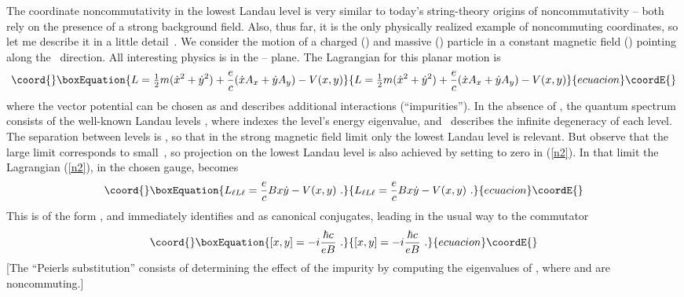 \documentclass[a4paper,12pt,twoside]{article}
\providecommand{\fract}[2]{{\textstyle\frac{#1}{#2}}}
\providecommand{\vA}{\vec A}
\providecommand{\ket}[1]{\bigl| #1 \bigr\rangle}
\providecommand{\numeq}[2]{\begin{equation}\coord{}\boxEquation{
#2
\label{#1}
}{
#2
}{ecuacion}\coordE{}\end{equation}}
\providecommand{\refeq}[1]{(\ref{#1})}
\let\vec\boldsymbol
\begin{document}
The coordinate noncommutativity in the lowest Landau level is very similar to today's
string-theory origins of noncommutativity -- both rely on the presence of a strong
background field. Also, thus far, it is the only physically realized example of noncommuting
coordinates, so let me describe it in a little detail~\cite{r2}.
We consider the motion of a charged (\coordHE{}) and massive (\coordHE{}) particle in a constant magnetic
field (\coordHE{}) pointing along the \coordHE{}~direction.  All interesting physics is in the \coordHE{}--\coordHE{} plane. The
Lagrangian for this planar motion is
\numeq{n2}{
L = \fract12 m(\dot x^2 +\dot y^2) + \frac ec (\dot x A_x + \dot y A_y) - V(x,y) 
}
where the vector potential \myHighlight{$\vA$}\coordHE{} can be chosen as \coordHE{} and \coordHE{} describes additional
interactions (``impurities''). In the absence of \coordHE{}, the quantum spectrum consists of the
well-known Landau levels \myHighlight{$\ket{N,d}$}\coordHE{}, where \coordHE{} indexes the level's energy eigenvalue,
and~\coordHE{} describes the infinite degeneracy of each level. The separation between levels is
\coordHE{}, so that in the strong magnetic field limit only the lowest Landau level \myHighlight{$\ket{0,d}$}\coordHE{} is
relevant. But observe that the large \coordHE{} limit corresponds to small~\coordHE{}, so projection on the
lowest Landau level is also achieved by setting \coordHE{} to zero in \refeq{n2}. In that limit the
Lagrangian \refeq{n2}, in the chosen gauge, becomes
\numeq{n3}{
L_{\ell L\ell} = \frac ec Bx\dot y - V(x,y)\ . 
}
This is of the form \coordHE{}, and immediately identifies \coordHE{} and \coordHE{} as
canonical conjugates, leading in the usual way to the commutator
\numeq{n4}{
[x,y] = - i \frac{\hbar c}{eB}\ .
}
[The ``Peierls substitution'' consists of determining the effect of the impurity by computing the
eigenvalues of \coordHE{}, where \coordHE{} and \coordHE{} are noncommuting.]
\end{document}
